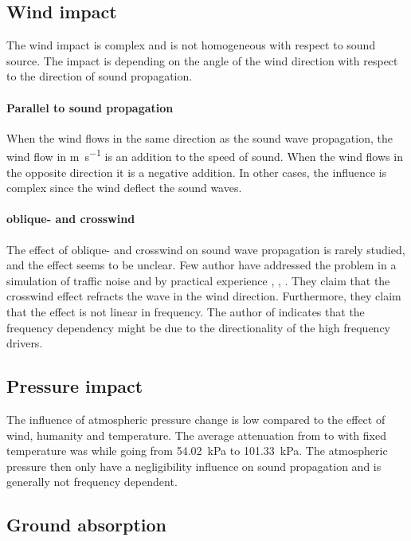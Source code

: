 \subsection{Wind impact}
The wind impact is complex and is not homogeneous with respect to sound source. The impact is depending on the angle of the wind direction with respect to the direction of sound propagation. 


\paragraph{Parallel to sound propagation} When the wind flows in the same direction as the sound wave propagation, the wind flow in \si{\meter\per\second} is an addition to the speed of sound. When the wind flows in the opposite direction it is a negative addition.  In other cases, the influence is complex since the wind deflect the sound waves.

\paragraph{oblique- and crosswind} The effect of oblique- and crosswind on sound wave propagation is rarely studied, and the effect seems to be unclear. Few author have addressed the problem in a simulation of traffic noise and by practical experience \citep{effect_of_wind}, \citep{crosswind_effect_2016}, \citep{BALLOU2008xi}. They claim that the crosswind effect refracts the wave in the wind direction. Furthermore, they claim that the effect is not linear in frequency. The author of \citep{BALLOU2008xi} indicates that the frequency dependency might be due to the directionality of the high frequency drivers. 



\subsection{Pressure impact}
The influence of atmospheric pressure change is low compared to the effect of wind, humanity and temperature. The average attenuation from  to  with fixed temperature was  while going from \SI{54.02}{\kilo\pascal} to \SI{101.33}{\kilo\pascal}. The atmospheric pressure then only have a negligibility influence on sound propagation and is generally not frequency dependent. 
 
 
\subsection{Ground absorption} 

